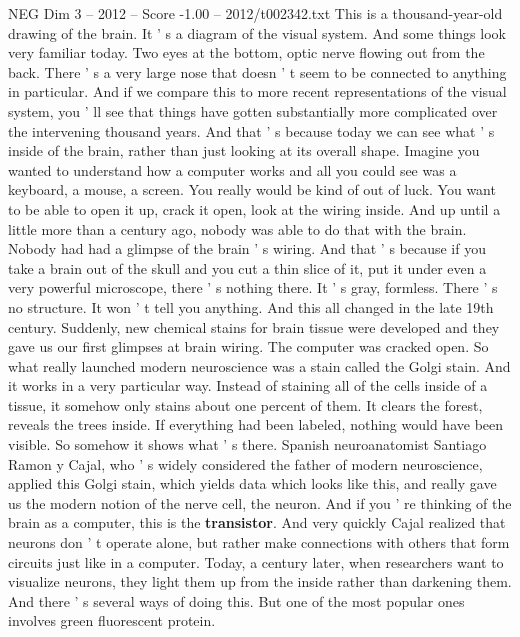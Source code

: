 \begin{textsample}{NEG Dim 3 – 2012 – Score -1.00 – 2012/t002342.txt}  \label{ex:f3_neg_038}
This is a thousand-year-old drawing of the brain.
It ' s a diagram of the visual system.
And some things look very familiar today.
Two eyes at the bottom, optic nerve flowing out from the back.
There ' s a very large nose that doesn ' t seem to be connected to anything in particular.
And if we compare this to more recent representations of the visual system, you ' ll see that things have gotten substantially more complicated over the intervening thousand years.
And that ' s because today we can see what ' s inside of the brain, rather than just looking at its overall shape.
Imagine you wanted to understand how a computer works and all you could see was a keyboard, a mouse, a screen.
You really would be kind of out of luck.
You want to be able to open it up, crack it open, look at the wiring inside.
And up until a little more than a century ago, nobody was able to do that with the brain.
Nobody had had a glimpse of the brain ' s wiring.
And that ' s because if you take a brain out of the skull and you cut a thin slice of it, put it under even a very powerful microscope, there ' s nothing there.
It ' s gray, formless.
There ' s no structure.
It won ' t tell you anything.
And this all changed in the late 19th century.
Suddenly, new chemical stains for brain tissue were developed and they gave us our first glimpses at brain wiring.
The computer was cracked open.
So what really launched modern neuroscience was a stain called the Golgi stain.
And it works in a very particular way.
Instead of staining all of the cells inside of a tissue, it somehow only stains about one percent of them.
It clears the forest, reveals the trees inside.
If everything had been labeled, nothing would have been visible.
So somehow it shows what ' s there.
Spanish neuroanatomist Santiago Ramon y Cajal, who ' s widely considered the father of modern neuroscience, applied this Golgi stain, which yields data which looks like this, and really gave us the modern notion of the nerve cell, the neuron.
And if you ' re thinking of the brain as a computer, this is the \textbf{transistor}.
And very quickly Cajal realized that neurons don ' t operate alone, but rather make connections with others that form circuits just like in a computer.
Today, a century later, when researchers want to visualize neurons, they light them up from the inside rather than darkening them.
And there ' s several ways of doing this.
But one of the most popular ones involves green fluorescent protein.

\end{textsample}
